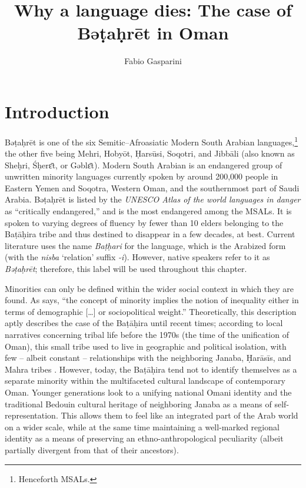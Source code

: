 \documentclass[output=paper]{langscibook}
\author{Fabio Gasparini \orcid{0000-0002-9196-8695} \affiliation{Free University of Berlin} }
\title{Why a language dies: The case of Bəṭaḥrēt in Oman }
\begin{document}
\maketitle 

\section{Introduction}
Bəṭaḥrēt is one of the six Semitic–Afroasiatic Modern South Arabian languages,\footnote{Henceforth MSALs.} the other five being Mehri, Hobyōt, Ḥarsūsi, Soqotri, and Jibbāli (also known as Sheḥri, Śḥerɛ̄t, or Gəblɛ̄t). Modern South Arabian is an endangered group of unwritten minority languages currently spoken by around 200,000 people in Eastern Yemen and Soqotra, Western Oman, and the southernmost part of Saudi Arabia. Bəṭaḥrēt is listed by the \textit{UNESCO Atlas of the world languages in danger} \citep{moseley_atlas_2010} as “critically endangered,” and is the most endangered among the MSALs. It is spoken to varying degrees of fluency by fewer than 10 elders belonging to the Baṭāḥira tribe and thus destined to disappear in a few decades, at best. Current literature uses the name \textit{Baṭḥari} for the language, which is the Arabized form (with the \textit{nisba} ‘relation’ suffix \textit{-i}). However, native speakers refer to it as \textit{Bəṭaḥrēt}; therefore, this label will be used throughout this chapter.


Minorities can only be defined within the wider social context in which they are found. As \citet[2]{miller_linguistic_2003}  says, “the concept of minority implies the notion of inequality either in terms of demographic […] or sociopolitical weight.” Theoretically, this description aptly describes the case of the Baṭāḥira until recent times; according to local narratives concerning tribal life before the 1970s (the time of the unification of Oman), this small tribe used to live in geographic and political isolation, with few – albeit constant – relationships with the neighboring Janaba, Ḥarāsīs, and Mahra tribes \citep{morris_thoughts_2017}. However, today, the Baṭāḥira tend not to identify themselves as a separate minority within the multifaceted cultural landscape of contemporary Oman. Younger generations look to a unifying national Omani identity and the traditional Bedouin cultural heritage of neighboring Janaba as a means of self-representation. This allows them to feel like an integrated part of the Arab world on a wider scale, while at the same time maintaining a well-marked regional identity as a means of preserving an ethno-anthropological peculiarity (albeit partially divergent from that of their ancestors).
\end{document}
